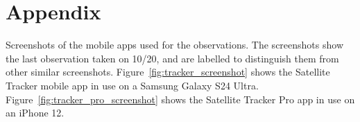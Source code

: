 \documentclass{article}
\begin{document}
\printbibliography

\newpage
\appendix
\section{Appendix} \label{Appendix}

Screenshots of the mobile apps used for the observations. The screenshots show the last observation taken on 10/20, and are labelled to distinguish them from other similar screenshots. Figure~\ref{fig:tracker_screenshot} shows the Satellite Tracker mobile app in use on a Samsung Galaxy S24 Ultra. Figure~\ref{fig:tracker_pro_screenshot} shows the Satellite Tracker Pro app in use on an iPhone 12.

\begin{figure}[h!]
    \centering


\end{figure}
\end{document}
